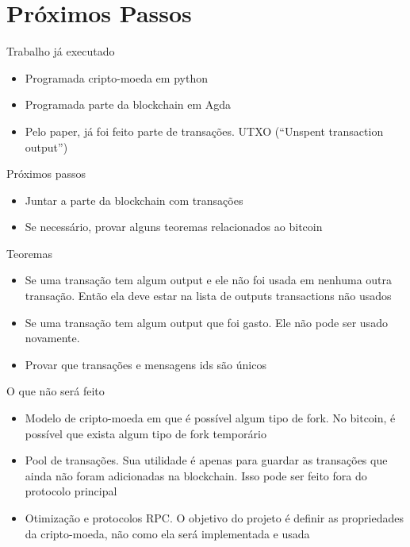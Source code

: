 \documentclass{beamer}
\begin{document}
\section{Próximos Passos}

\begin{frame}{Trabalho já executado}
  \begin{itemize}
      \item Programada cripto-moeda em python
      \item Programada parte da blockchain em Agda
      \item Pelo paper, já foi feito parte de transações. UTXO (\foreignquote{english}{Unspent transaction output})
  \end{itemize}
\end{frame}

  
\begin{frame}{Próximos passos}
  \begin{itemize}
      \item Juntar a parte da blockchain com transações
      \item Se necessário, provar alguns teoremas relacionados ao bitcoin
  \end{itemize}
\end{frame}

\begin{frame}{Teoremas}
  \begin{itemize}
      \item Se uma transação tem algum output e ele não foi usada em nenhuma outra transação. Então ela deve estar na lista de outputs transactions não usados
      \item Se uma transação tem algum output que foi gasto. Ele não pode ser usado novamente.
      \item Provar que transações e mensagens ids são únicos
  \end{itemize}
\end{frame}

\begin{frame}{O que não será feito}
  \begin{itemize}
    \item Modelo de cripto-moeda em que é possível algum tipo de fork. No bitcoin, é possível que exista algum tipo de fork temporário
    \item Pool de transações. Sua utilidade é apenas para guardar as transações que ainda não foram adicionadas na blockchain. 
    Isso pode ser feito fora do protocolo principal
    \item Otimização e protocolos RPC. O objetivo do projeto é definir as propriedades da cripto-moeda, não como ela será implementada e usada
  \end{itemize}
\end{frame}
\end{document}
